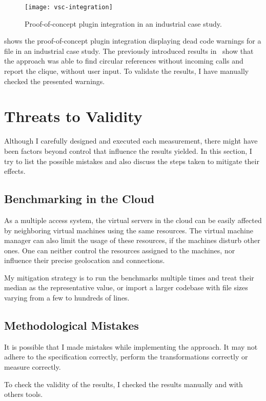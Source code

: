 \begin{figure}[!htb]
  \centering
  \texttt{[image: vsc-integration]}
  \caption{Proof-of-concept plugin integration in an industrial case study.}
  \label{fig:vsc-integration}
\end{figure}

 shows the proof-of-concept plugin integration displaying dead code warnings for a file in an industrial case study. The previously introduced results in~ show that the approach was able to find circular references without incoming calls and report the clique, without user input. To validate the results, I have manually checked the presented warnings.


\section{Threats to Validity}
\label{sect:evaluation-threats}
Although I carefully designed and executed each measurement, there might have been factors beyond control that influence the results yielded. In this section, I try to list the possible mistakes and also discuss the steps taken to mitigate their effects.

\subsection{Benchmarking in the Cloud} As a multiple access system, the virtual servers in the cloud can be easily affected by neighboring virtual machines using the same resources. The virtual machine manager can also limit the usage of these resources, if the machines disturb other ones. One can neither control the resources assigned to the machines, nor influence their precise geolocation and connections.

My mitigation strategy is to run the benchmarks multiple times and treat their median as the representative value, or import a larger codebase with file sizes varying from a few to hundreds of lines.

\subsection{Methodological Mistakes} It is possible that I made mistakes while implementing the approach. It may not adhere to the specification correctly, perform the transformations correctly or measure correctly.

To check the validity of the results, I checked the results manually and with others tools.
